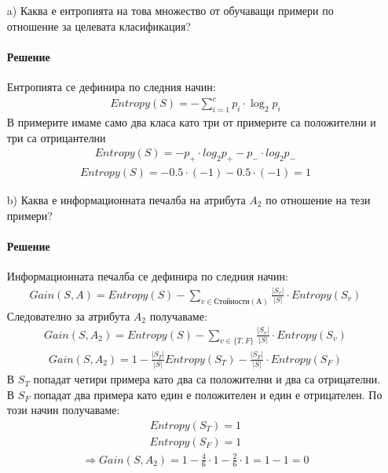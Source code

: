\documentclass{article}
\begin{document}
\begin{enumerate}
\item [a)]
Каква е ентропията на това множество от обучаващи примери по отношение
за целевата класификация?
\paragraph{Решение}
Ентропията се дефинира по следния начин:
\begin{gather}
	Entropy(S) = - \sum_{i=1}^c p_i \cdot \log_2 p_i
\end{gather}
В примерите имаме само два класа като три от примерите са положителни и три са отрицантелни
\begin{gather}
	Entropy(S) = - p_+ \cdot log_2 p_+ - p_- \cdot log_2 p_-
\end{gather}
\begin{gather}
	Entropy(S) = - 0.5 \cdot (-1) - 0.5 \cdot (-1) = 1
\end{gather}

\item [b)]
Каква е информационната печалба на атрибута $A_2$ по отношение на тези
примери?
\paragraph{Решение}
Информационната печалба се дефинира по следния начин:
\begin{gather}
	Gain(S, A) = Entropy(S) - \sum_{v \in Стойности(А)} \frac{\mathopen|S_v\mathclose|}{\mathopen|S\mathclose|} \cdot Entropy(S_v)
\end{gather}
Следователно за атрибута $A_2$ получаваме:
\begin{gather}
	Gain(S, A_2) = Entropy(S) - \sum_{v \in \{T, F\}} \frac{\mathopen|S_v\mathclose|}{\mathopen|S\mathclose|} \cdot Entropy(S_v)
\end{gather}
\begin{gather}
	Gain(S, A_2) = 1 - 
	\frac{\mathopen|S_T\mathclose|}
		{\mathopen|S\mathclose|} Entropy(S_T) - 				\frac{\mathopen|S_F\mathclose|}{\mathopen|S\mathclose|} \cdot Entropy(S_F)
\end{gather}
В $S_T$ попадат четири примера като два са положителни и два са отрицателни. В $S_F$ попадат два примера като един е положителен и един е отрицателен. По този начин получаваме:
\begin{gather}
	Entropy(S_T) = 1
\end{gather}
\begin{gather}
	Entropy(S_F) = 1
\end{gather}
\begin{gather}
	\Rightarrow
	Gain(S, A_2) = 1 - \frac{4}{6} \cdot 1 - \frac{2}{6}\cdot 1 = 
		1 - 1 = 0
\end{gather}
\end{enumerate}
\end{document}
